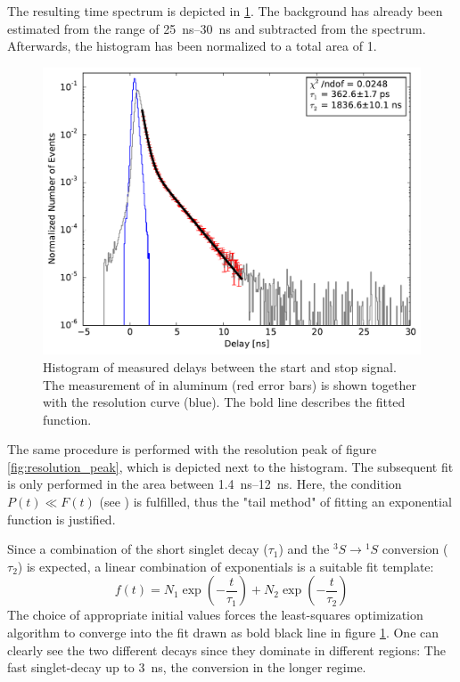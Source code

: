 \documentclass[
	paper=A4,
	parskip=full,
	chapterprefix=true,
	11pt,
	headings=normal,
	bibliography=totoc,
	listof=totoc,
	titlepage=on,
]{scrreprt}
\begin{document}
The resulting time spectrum is depicted in \ref{fig:Na22_poly}. The background has already been estimated from the range of \SIrange{25}{30}{\nano\second} and subtracted from the spectrum. Afterwards, the histogram has been normalized to a total area of \num{1}.

\begin{figure}
	\centering
	\includegraphics{na22_polyethylen}
	\caption{Histogram of measured delays between the start and stop signal. The measurement of  in aluminum (red error bars) is shown together with the resolution curve (blue). The bold line describes the fitted function.}
	\label{fig:Na22_poly}
\end{figure}

The same procedure is performed with the resolution peak of figure \ref{fig:resolution_peak}, which is depicted next to the histogram. The subsequent fit is only performed in the area between \SIrange{1.4}{12}{\nano\second}. Here, the condition $P(t) \ll F(t)$ (see \cite{Lab_manual_T8}) is fulfilled, thus the "tail method" of fitting an exponential function is justified.

Since a combination of the short singlet decay ($\tau_1$) and the ${^3S} \rightarrow {^1S}$ conversion ($\tau_2$) is expected, a linear combination of exponentials is a suitable fit template:
\begin{equation}
	f(t) = N_1 \exp(-\frac{t}{\tau_1}) + N_2 \exp(-\frac{t}{\tau_2})
\end{equation}
The choice of appropriate initial values forces the least-squares optimization algorithm to converge into the fit drawn as bold black line in figure \ref{fig:Na22_poly}. One can clearly see the two different decays since they dominate in different regions: The fast singlet-decay up to \SI{3}{\nano\second}, the conversion in the longer regime.
\end{document}
